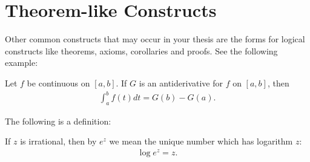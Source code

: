 \section{Theorem-like Constructs}
\label{section:constructs}
Other common constructs that may occur in your thesis are
the forms for logical constructs like theorems, axioms,
corollaries and proofs. See the following example:

\begin{Theorem}
Let $f$ be continuous on $[a,b]$.  If $G$ is
an antiderivative for $f$ on $[a,b]$, then
\begin{align}
  \int^b_af(t)dt = G(b) - G(a).
\end{align}
\end{Theorem}

The following is a definition:
\begin{Definition}
If $z$ is irrational, then by $e^z$ we mean the
unique number which has logarithm $z$:
\begin{align}
  \log e^z = z.
\end{align}
\end{Definition}


